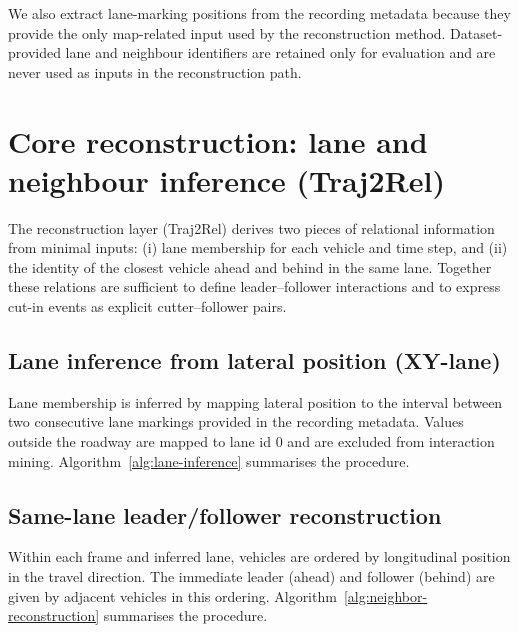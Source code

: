 \documentclass[12pt,a4paper,twoside,openright]{report}
\begin{document}
    We also extract lane-marking positions from the recording metadata because they provide the only map-related input used by the reconstruction method. Dataset-provided lane and neighbour identifiers are retained only for evaluation and are never used as inputs in the reconstruction path.

    \section{Core reconstruction: lane and neighbour inference (Traj2Rel)}
    The reconstruction layer (Traj2Rel) derives two pieces of relational information from minimal inputs: (i) lane membership for each vehicle and time step, and (ii) the identity of the closest vehicle ahead and behind in the same lane. Together these relations are sufficient to define leader--follower interactions and to express cut-in events as explicit cutter--follower pairs.

    \subsection{Lane inference from lateral position (XY-lane)}
    Lane membership is inferred by mapping lateral position to the interval between two consecutive lane markings provided in the recording metadata. Values outside the roadway are mapped to lane id 0 and are excluded from interaction mining. Algorithm~\ref{alg:lane-inference} summarises the procedure.

    \begin{algorithm}[t]
\caption{Lane inference from lateral position and lane markings}
\label{alg:lane-inference}

\ForEach{frame $t$}{
    \If{$y(t) \notin [b_0, b_K)$}{
        $\ell(t) \leftarrow 0$\tcp*{outside valid lanes}
    }
    \Else{
        find $k$ such that $b_{k-1} \le y(t) < b_k$\;
        $\ell(t) \leftarrow k$\;
    }
}
    \end{algorithm}

    \subsection{Same-lane leader/follower reconstruction}
    Within each frame and inferred lane, vehicles are ordered by longitudinal position in the travel direction. The immediate leader (ahead) and follower (behind) are given by adjacent vehicles in this ordering. Algorithm~\ref{alg:neighbor-reconstruction} summarises the procedure.
\end{document}
